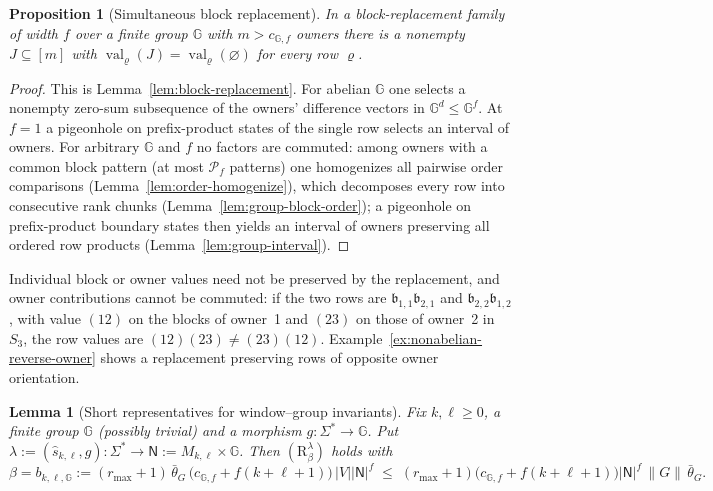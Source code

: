 \documentclass[11pt]{article}
\numberwithin{equation}{section}
\theoremstyle{plain}
\newtheorem{lemma}[theorem]{Lemma}
\newtheorem{proposition}[theorem]{Proposition}
\theoremstyle{definition}
\theoremstyle{remark}
\theoremstyle{plain}
\begin{document}
\begin{proposition}[Simultaneous block replacement]
\label{prop:block-replacement-interface}
In a block-replacement family of width $f$ over a finite group ${\mathbb G}$ with
$m>c_{{\mathbb G},f}$ owners there is a nonempty $J\subseteq[m]$ with
$\operatorname{val}_\varrho(J)=\operatorname{val}_\varrho(\varnothing)$ for every row $\varrho$.
\end{proposition}

\begin{proof}
This is Lemma~\ref{lem:block-replacement}.  For abelian ${\mathbb G}$ one selects a
nonempty zero-sum subsequence of the owners' difference vectors in
${\mathbb G}^d\le {\mathbb G}^f$.  At $f=1$ a pigeonhole on prefix-product states of the single row
selects an interval of owners.  For arbitrary ${\mathbb G}$ and $f$ no factors are commuted: among owners with a
common block pattern (at most $\mathcal P_f$ patterns) one homogenizes all pairwise order
comparisons (Lemma~\ref{lem:order-homogenize}), which decomposes every row into
consecutive rank chunks (Lemma~\ref{lem:group-block-order}); a pigeonhole on
prefix-product boundary states then yields an interval of owners preserving all
ordered row products (Lemma~\ref{lem:group-interval}).
\end{proof}

Individual block or owner values need not be preserved by the replacement, and
owner contributions cannot be commuted: if the two rows are
$\mathfrak b_{1,1}\mathfrak b_{2,1}$ and $\mathfrak b_{2,2}\mathfrak b_{1,2}$, with value $(12)$ on the
blocks of owner~1 and $(23)$ on those of owner~2 in $S_3$, the row values are
$(12)(23)\ne(23)(12)$.
Example~\ref{ex:nonabelian-reverse-owner} shows a replacement preserving rows of
opposite owner orientation.

\begin{lemma}[Short representatives for window--group invariants]
\label{lem:marked-heavy-window-group}
Fix $k,\ell\ge0$, a finite group ${\mathbb G}$ (possibly trivial) and a morphism
$g:\Sigma^*\to {\mathbb G}$.  Put $\lambda:=(\widehat s_{k,\ell},g):\Sigma^*\to
\mathsf N:=M_{k,\ell}\times {\mathbb G}$.  Then $(\mathrm R_\beta^\lambda)$ holds with
\[
 \beta=b_{k,\ell,{\mathbb G}}:=(r_{\max}+1)\,\bar\theta_G\,\bigl(c_{{\mathbb G},f}+f(k+\ell+1)\bigr)\,|V||\mathsf N|^f
 \;\le\;(r_{\max}+1)\bigl(c_{{\mathbb G},f}+f(k+\ell+1)\bigr)|\mathsf N|^f\,\|G\|\,\bar\theta_G .
\]
\end{lemma}
\end{document}
